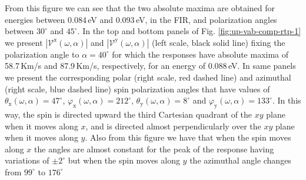\documentclass[prb,11pt,tightenlines,twocolumn,aps]{revtex4-1}
\begin{document}
%
From this figure we can see that the two absolute maxima are obtained for
energies between 0.084\,eV and 0.093\,eV, in the FIR, and polarization angles
between $30^ {\circ}$ and $45^{\circ}$.
% 
In the top and bottom panels of Fig. \ref{fig:up-vab-comp-rtp-1} we present $|
\mathcal{V}^{\mathrm{x}} (\omega,\alpha)|$ and $|\mathcal{V}^{\mathrm{y}}
(\omega,\alpha)|$ (left scale, black solid line) fixing the polarization angle
to $\alpha=40^{\circ}$ for which the responses have absolute maxima of
58.7\,Km/s and 87.9\,Km/s, respectively, for an energy of 0.088\,eV.
% 
In same panels we present the corresponding polar (right scale, red dashed
line) and azimuthal (right scale, blue dashed line) spin polarization angles
that have values of $\theta_{\mathrm{x}}(\omega,\alpha) = 47^{\circ}$,
$\varphi_{\mathrm{x}}(\omega,\alpha) = 212^{\circ}$, $\theta_{\mathrm{y}}
(\omega,\alpha) = 8^{\circ}$ and $\varphi_{\mathrm{y}} (\omega,\alpha) =
133^{\circ}$. In this way, the spin is directed upward the third Cartesian
quadrant of the $xy$ plane when it moves along $x$, and is directed almost
perpendicularly over the $xy$ plane when it moves along $y$.
% 
Also from this figure we have that when the spin moves along $x$ the angles are
almost constant for the peak of the response having variations of $\pm
2^{\circ}$ but when the spin moves along $y$ the azimuthal angle changes from
$99^{\circ}$ to $176^{\circ}$
\end{document}
